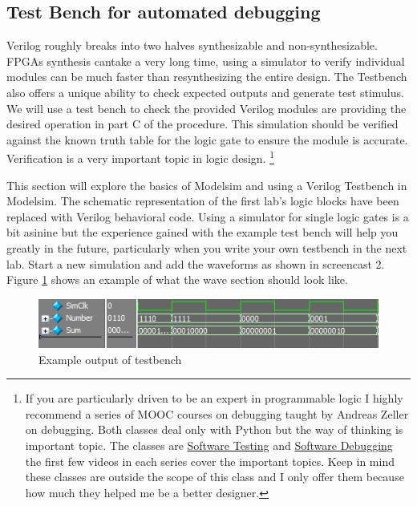     \subsection{Test Bench for automated debugging}
      Verilog roughly breaks into two halves synthesizable and non-synthesizable. FPGAs synthesis cantake a very long time, using a simulator to verify individual modules can be much faster than resynthesizing the entire design. The Testbench also offers a unique ability to check expected outputs and generate test stimulus. We will use a test bench to check the provided Verilog modules are providing the desired operation in part C of the procedure. This simulation should be verified against the known truth table for the logic gate to ensure the module is accurate. Verification is a very important topic in logic design. \footnote{If you are particularly driven to be an expert in programmable logic I highly recommend a series of MOOC courses on debugging taught by Andreas Zeller on debugging. Both classes deal only with Python but the way of thinking is important topic. The classes are \href{https://www.udacity.com/course/cs258}{Software Testing} and \href{https://www.udacity.com/course/cs259}{Software Debugging} the first few videos in each series cover the important topics. Keep in mind these classes are outside the scope of this class and I only offer them because how much they helped me be a better designer.}

      

      This section will explore the basics of Modelsim and using a Verilog Testbench in Modelsim. The schematic representation of the first lab's logic blocks have been replaced with Verilog behavioral code. Using a simulator for single logic gates is a bit asinine but the experience gained with the example test bench will help you greatly in the future, particularly when you write your own testbench in the next lab. Start a new simulation and add the waveforms as shown in screencast 2. Figure \ref{LogicOut} shows an example of what the wave section should look like. 
      \begin{figure}[H]
        \includegraphics[width=.48\textwidth]{Images/LogicOutput.png}
        \caption{Example output of testbench}
        \label{LogicOut}
      \end{figure}

